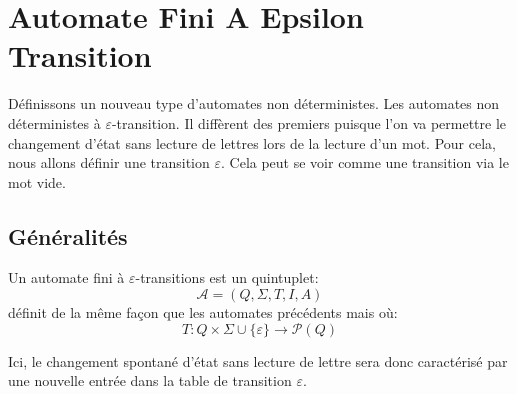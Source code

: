 \chapter{Automate Fini A Epsilon Transition}

\minitoc %

\setlength{\parindent}{0pt}
\renewcommand{\labelitemi}{\textbullet} %



Définissons un nouveau type d'automates non déterministes. Les automates non déterministes à $\varepsilon$-transition. 
Il diffèrent des premiers puisque l'on va permettre le changement d'état sans lecture de lettres lors 
de la lecture d'un mot. Pour cela, nous allons définir une transition $\varepsilon$. 
Cela peut se voir comme une transition via le mot vide. 


\section{Généralités}

\begin{definition}
    Un automate fini à $\varepsilon$-transitions est un quintuplet: 
        \[ \mathcal{A} = (Q,\Sigma, T, I, A) \] 
    définit de la même façon que les automates précédents mais où: 
        \[ T : Q \times \Sigma \cup \{\varepsilon\} \longrightarrow \mathcal{P}(Q) \] 
\end{definition}

Ici, le changement spontané d'état sans lecture de lettre sera donc caractérisé par une nouvelle 
entrée dans la table de transition $\varepsilon$. 

